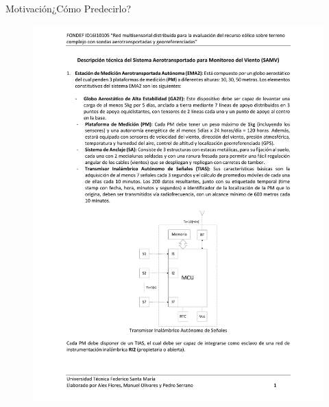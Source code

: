 \documentclass[mathserif,10pt]{beamer}
\begin{document}
\begin{frame}{Motivación}{¿Cómo Predecirlo?}
	\begin{figure}[h]
		\begin{minipage}{0.5\linewidth}
		\centering
		\includegraphics[width=1.0\linewidth,page=5,trim={5cm 9cm 2.3cm 3cm},clip]{fig/01/descrp}
		\end{minipage}%
		\begin{minipage}{0.5\linewidth}
			\centering

\end{minipage}
\end{figure}
\end{frame}
\end{document}
